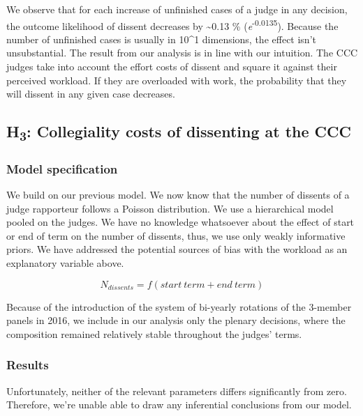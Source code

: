 \documentclass[
  11pt,
]{article}
\begin{document}
We observe that for each increase of unfinished cases of a judge in any
decision, the outcome likelihood of dissent decreases by
\textasciitilde0.13 \% (\emph{e}\textsuperscript{-0.0135}). Because the
number of unfinished cases is usually in 10\^{}1 dimensions, the effect
isn't unsubstantial. The result from our analysis is in line with our
intuition. The CCC judges take into account the effort costs of dissent
and square it against their perceived workload. If they are overloaded
with work, the probability that they will dissent in any given case
decreases.

\hypertarget{h3-collegiality-costs-of-dissenting-at-the-ccc}{%
\subsection{\texorpdfstring{H\textsubscript{3}: Collegiality costs of
dissenting at the
CCC}{H3: Collegiality costs of dissenting at the CCC}}\label{h3-collegiality-costs-of-dissenting-at-the-ccc}}

\hypertarget{model-specification-2}{%
\subsubsection{Model specification}\label{model-specification-2}}

We build on our previous model. We now know that the number of dissents
of a judge rapporteur follows a Poisson distribution. We use a
hierarchical model pooled on the judges. We have no knowledge whatsoever
about the effect of start or end of term on the number of dissents,
thus, we use only weakly informative priors. We have addressed the
potential sources of bias with the workload as an explanatory variable
above.

\[
N_{dissents} = f(start\:term + end\:term)
\]

Because of the introduction of the system of bi-yearly rotations of the
3-member panels in 2016, we include in our analysis only the plenary
decisions, where the composition remained relatively stable throughout
the judges' terms.

\hypertarget{results-1}{%
\subsubsection{Results}\label{results-1}}

Unfortunately, neither of the relevant parameters differs significantly
from zero. Therefore, we're unable able to draw any inferential
conclusions from our model.
\end{document}
